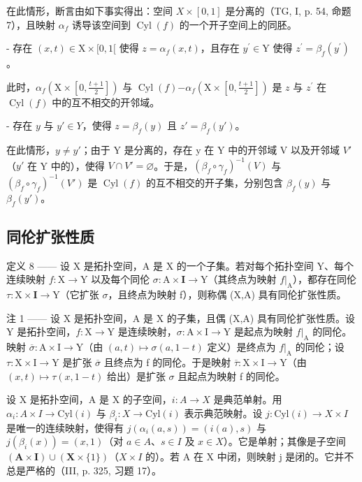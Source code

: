 在此情形，断言由如下事实得出：空间 \(X \times [0,1]\) 是分离的（TG, I, p. 54, 命题 7），且映射 \(\alpha_{f}\) 诱导该空间到 \(\operatorname{Cyl}(f)\) 的一个开子空间上的同胚。

- 存在 \((x,t)\in \mathrm{X}\times [0,1[\) 使得 \(z = \alpha_{f}(x,t)\)，且存在 \(y^{\prime}\in \mathrm{Y}\) 使得 \(z^{\prime} = \beta_{f}(y^{\prime})\)。

此时，\(\alpha_{f}(\mathrm{X}\times [0,\frac{t + 1}{2}])\) 与 \(\operatorname {Cyl}(f)\mathbf{-}\alpha_{f}(\mathrm{X}\times [0,\frac{t + 1}{2}])\) 是 \(z\) 与 \(z^{\prime}\) 在 \(\operatorname {Cyl}(f)\) 中的互不相交的开邻域。

- 存在 \(y\) 与 \(y'\in Y\)，使得 \(z=\beta_f(y)\) 且 \(z'=\beta_f(y')\)。

在此情形，\(y\neq y'\)；由于 Y 是分离的，存在 y 在 Y 中的开邻域 V 以及开邻域 \(V'\)（\(y'\) 在 Y 中的），使得 \(V\cap V'=\varnothing\)。于是，\((\beta_f\circ\gamma_f)^{-1}(V)\) 与 \((\beta_f\circ\gamma_f)^{-1}(V')\) 是 \(\operatorname{Cyl}(f)\) 的互不相交的开子集，分别包含 \(\beta_f(y)\) 与 \(\beta_f(y')\)。

\subsection{同伦扩张性质}

定义 8 —— 设 X 是拓扑空间，A 是 X 的一个子集。若对每个拓扑空间 Y、每个连续映射 \(f:\mathrm{X}\to\mathrm{Y}\) 以及每个同伦 \(\sigma:\mathrm{A}\times\mathbf{I}\to\mathrm{Y}\)（其终点为映射 \(f|_{\mathrm{A}}\)），都存在同伦 \(\tau:\mathrm{X}\times\mathbf{I}\to\mathrm{Y}\)（它扩张 \(\sigma\)，且终点为映射 f），则称偶 (X,A) 具有同伦扩张性质。

注 1 —— 设 X 是拓扑空间，A 是 X 的子集，且偶 (X,A) 具有同伦扩张性质。设 Y 是拓扑空间，\(f:\mathrm{X}\to\mathrm{Y}\) 是连续映射，\(\sigma:\mathrm{A}\times\mathrm{I}\to\mathrm{Y}\) 是起点为映射 \(f|_{\mathrm{A}}\) 的同伦。映射 \(\overline{\sigma}:\mathrm{A}\times\mathrm{I}\to\mathrm{Y}\)（由 \((a,t)\mapsto\sigma(a,1-t)\) 定义）是终点为 \(f|_{\mathrm{A}}\) 的同伦；设 \(\tau:\mathrm{X}\times\mathrm{I}\to\mathrm{Y}\) 是扩张 \(\overline{\sigma}\) 且终点为 f 的同伦。于是映射 \(\overline{\tau}:\mathrm{X}\times\mathrm{I}\to\mathrm{Y}\)（由 \((x,t)\mapsto\tau(x,1-t)\) 给出）是扩张 \(\sigma\) 且起点为映射 f 的同伦。

设 X 是拓扑空间，A 是 X 的子空间，\(i: A \to X\) 是典范单射。用 \(\alpha_{i}: A \times I \to \text{Cyl}(i)\) 与 \(\beta_{i}: X \to \text{Cyl}(i)\) 表示典范映射。设 \(j: \text{Cyl}(i) \to X \times I\) 是唯一的连续映射，使得有 \(j(\alpha_{i}(a, s)) = (i(a), s)\) 与 \(j(\beta_{i}(x)) = (x, 1)\)（对 \(a \in A\)、\(s \in I\) 及 \(x \in X\)）。它是单射；其像是子空间 \((\mathbf{A} \times \mathbf{I}) \cup (\mathbf{X} \times \{1\})\)（\(X \times I\) 的）。若 A 在 X 中闭，则映射 j 是闭的。它并不总是严格的（III, p. 325, 习题 17）。

